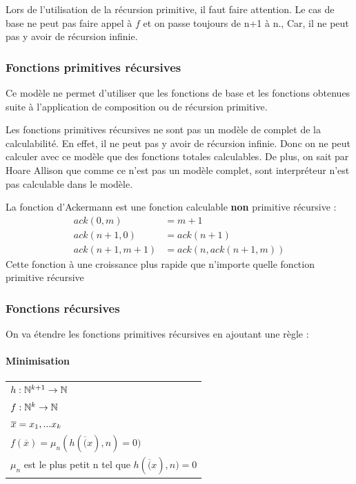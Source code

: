 \begin{myrem}
	Lors de l'utilisation de la récursion primitive, il faut faire 
	attention. Le cas de base ne peut pas faire appel à $f$ et on passe 
	toujours de n+1 à n., Car, il ne peut pas y avoir de récursion infinie.
\end{myrem}

\subsubsection{Fonctions primitives récursives}
Ce modèle ne permet d'utiliser que les fonctions de base et les fonctions 
obtenues suite à l'application de composition ou de récursion primitive.

\begin{myprop}
	Les fonctions primitives récursives ne sont pas un modèle de complet de 
	la calculabilité. En effet, il ne peut pas y avoir de récursion 
	infinie. Donc on ne peut calculer avec ce modèle que des fonctions 
	totales calculables. De plus, on sait par Hoare Allison que comme ce 
	n'est pas un modèle complet, sont interpréteur n'est pas calculable 
	dans le modèle.
\end{myprop}

\begin{myexem}
	La fonction d'Ackermann est une fonction calculable \textbf{non} 
	primitive récursive :
	\begin{align}
		ack(0,m) &= m+1 \\
		ack(n+1,0) &= ack(n+1)\\
		ack(n+1,m+1) &= ack(n, ack(n+1,m))
	\end{align}
	Cette fonction à une croissance plus rapide que n'importe quelle fonction 
	primitive récursive
\end{myexem}


\subsubsection{Fonctions récursives}
\label{ssub:fonctions_r_cursives}
On va étendre les fonctions primitives récursives en ajoutant une règle :

\paragraph{Minimisation}
\begin{tabular}{|l|}
	\hline
	$h: \mathbb{N}^{k+1} \rightarrow \mathbb{N}$\\
	$f: \mathbb{N}^{k} \rightarrow \mathbb{N}$\\
	$\overline{x} =x_1,...x_k$ \\
	$f(\overline{x}) = \mu_n (h(\overline(x), n) =0)$\\
	$\mu_n$ est le plus petit n tel que $h(\overline(x), n) =0$ \\
	\hline
\end{tabular}

